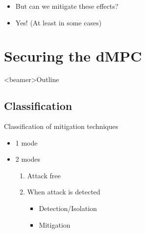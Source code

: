 \documentclass[aspectratio=169]{beamer}
\begin{document}
\begin{frame}{}
  \begin{itemize}[<+->]
    \item But can we mitigate these effects?
    \item Yes! (At least in some cases)
  \end{itemize}
\end{frame}

\section{Securing the dMPC}

\begin{frame}<beamer>{Outline}
  \tableofcontents[sectionstyle=show/hide,subsectionstyle=show/show/show,subsubsectionstyle=hide]
\end{frame}

\subsection{Classification}

\begin{frame}{Classification of mitigation techniques}
  \begin{minipage}[t]{.45\linewidth}
    \begin{itemize}
      \item<2-> 1 mode
    \end{itemize}
  \end{minipage}
  \hfill
  \begin{minipage}[t]{.45\linewidth}
    \begin{itemize}
      \item<2-> 2 modes
            \begin{enumerate}
              \item<3-> Attack free
              \item<3-> When attack is detected
                    \begin{itemize}
                      \item<4-> Detection/Isolation
                      \item<4-> Mitigation
                    \end{itemize}
            \end{enumerate}
    \end{itemize}
  \end{minipage}
\end{frame}
\end{document}
